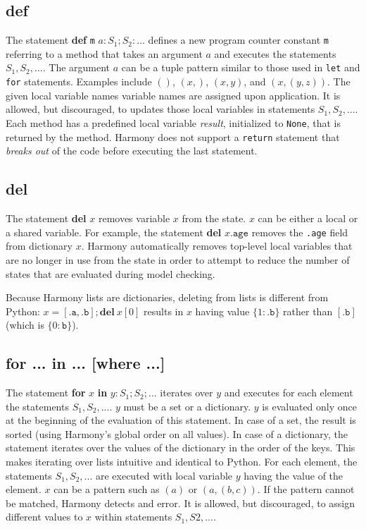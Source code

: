 \documentclass{report}
\begin{document}
\subsection*{\textbf{def}}

The statement \textbf{def} \texttt{m} $a: S_1; S_2: ...$
defines a new program counter constant \texttt{m} referring to
a method that takes an argument $a$ and executes the statements
$S_1, S_2, ...$.  The argument $a$ can be a tuple pattern similar
to those used in \texttt{let} and \texttt{for} statements.
Examples include $()$, $(x,)$, $(x, y)$, and $(x, (y, z))$.
The given local variable names variable names are assigned
upon application.
It is allowed, but discouraged, to updates those local variables
in statements $S_1, S_2, ...$.
Each method has a predefined local variable
\textit{result}, initialized to \texttt{None},
that is returned by the method.  Harmony does
not support a \texttt{return} statement that \emph{breaks out}
of the code before executing the last statement.

\subsection*{\textbf{del}}

The statement \textbf{del} $x$ removes variable $x$ from the
state.  $x$ can be either a local or a shared variable.  For
example, the statement \textbf{del} $x.\texttt{age}$ removes
the \texttt{.age} field from dictionary $x$.
Harmony automatically removes top-level local variables that
are no longer in use
from the state in order to attempt to reduce the number of states
that are evaluated during model checking.

Because Harmony lists are dictionaries, deleting from lists is different
from Python:
$x = [\mathtt{.a}, \mathtt{.b}]; \mathbf{del}~x[0]$ results in $x$ having value
$\{1: \mathtt{.b}\}$ rather than $[\mathtt{.b}]$ (which is $\{0: \mathtt{b}\}$).

\subsection*{\textbf{for ... in ... [where ...]}}

The statement \textbf{for} $x$ \textbf{in} $y: S_1; S_2; ...$
iterates over $y$ and executes for each element the statements
$S_1, S_2, ...$.
$y$ must be a set or a dictionary.  $y$ is evaluated only once at
the beginning of the evaluation of this statement.  In case of a set,
the result is sorted (using Harmony's global order on all values).
In case of a dictionary, the statement iterates over the values of
the dictionary in the order of the keys.  This makes iterating over
lists intuitive and identical to Python.
For each element, the statements $S_1, S_2, ...$ are executed with
local variable $y$ having the value of the element.
$x$ can be a pattern such as $(a)$ or $(a, (b, c))$.
If the pattern cannot be matched, Harmony detects and error.
It is allowed, but discouraged, to assign different values to $x$
within statements $S_1, S2, ...$.
\end{document}
